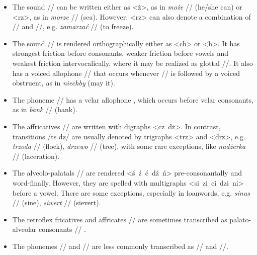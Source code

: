 \begin{itemize}
\item The sound // can be written either as <ż>, as in \textit{może} // (he/she can) or <rz>, as in \textit{morze} // (sea). However, <rz> can also denote a combination of // and //, e.g. \textit{zamarzać} // (to freeze).
\item The sound // is rendered orthographically either as <ch> or <h>. It has strongest friction before consonants, weaker friction before vowels and weakest friction intervocalically, where it may be realized as glottal //. It also has a voiced allophone // that occurs whenever // is followed by a voiced obstruent, as in \textit{niechby} (may it).
\item The phoneme // has a velar allophone , which occurs before velar consonants, as in \textit{bank} // (bank).
\item The  affricatives // are written with digraphs <cz~dż>. In contrast, transitions /t\:s d\:z/ are usually denoted by trigraphs <trz> and <drz>, e.g. \textit{trzoda} // (flock), \textit{drzewo} // (tree), with some rare exceptions, like \textit{nadżerka} // (laceration).
\item The alveolo-palatals // are rendered <ś~ź~ć~dź~ń> pre-consonantally and word-finally. However, they are spelled with multigraphs <si~zi~ci~dzi~ni> before a vowel. There are some exceptions, especially in loanwords, e.g. \textit{sinus} // (sine), \textit{siwert} // (sievert).
\item The retroflex fricatives and affricates // are sometimes transcribed as palato-alveolar consonants // \cite{jassem2003polish}.
\item The phonemes // and // are less commonly transcribed as // and /\textipa{\textbardotlessj}/.
\end{itemize}

